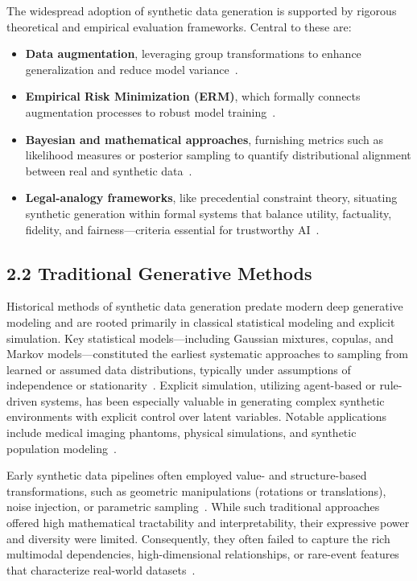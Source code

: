 \documentclass[11pt]{article}
\begin{document}
The widespread adoption of synthetic data generation is supported by rigorous theoretical and empirical evaluation frameworks. Central to these are:
\begin{itemize}
    \item \textbf{Data augmentation}, leveraging group transformations to enhance generalization and reduce model variance~\cite{56,57}.
    \item \textbf{Empirical Risk Minimization (ERM)}, which formally connects augmentation processes to robust model training~\cite{56}.
    \item \textbf{Bayesian and mathematical approaches}, furnishing metrics such as likelihood measures or posterior sampling to quantify distributional alignment between real and synthetic data~\cite{57,70,71}.
    \item \textbf{Legal-analogy frameworks}, like precedential constraint theory, situating synthetic generation within formal systems that balance utility, factuality, fidelity, and fairness—criteria essential for trustworthy AI~\cite{84,87,88}.
\end{itemize}

\subsection{2.2 Traditional Generative Methods}

Historical methods of synthetic data generation predate modern deep generative modeling and are rooted primarily in classical statistical modeling and explicit simulation. Key statistical models—including Gaussian mixtures, copulas, and Markov models—constituted the earliest systematic approaches to sampling from learned or assumed data distributions, typically under assumptions of independence or stationarity~\cite{13,64,87}. Explicit simulation, utilizing agent-based or rule-driven systems, has been especially valuable in generating complex synthetic environments with explicit control over latent variables. Notable applications include medical imaging phantoms, physical simulations, and synthetic population modeling~\cite{81,87}.

Early synthetic data pipelines often employed value- and structure-based transformations, such as geometric manipulations (rotations or translations), noise injection, or parametric sampling~\cite{13,56,57,64}. While such traditional approaches offered high mathematical tractability and interpretability, their expressive power and diversity were limited. Consequently, they often failed to capture the rich multimodal dependencies, high-dimensional relationships, or rare-event features that characterize real-world datasets~\cite{57,71,81,87}.
\end{document}
